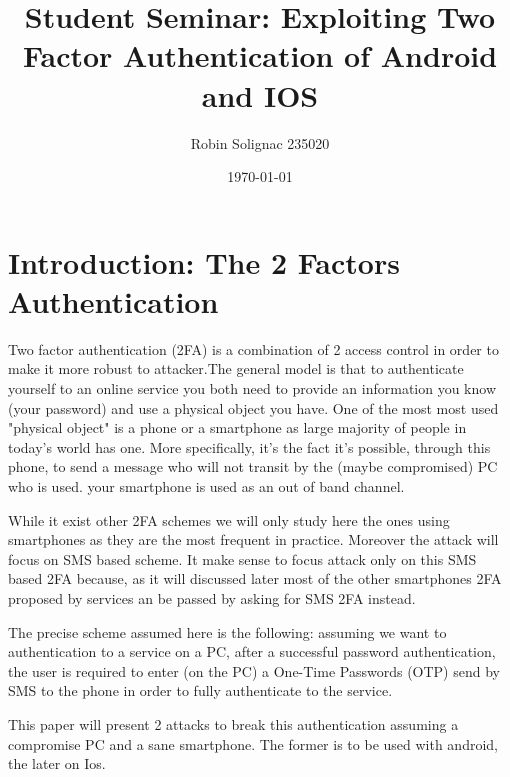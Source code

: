 \documentclass[11pt, a4paper,twocolumn]{article}
\title{Student Seminar: Exploiting Two Factor Authentication of Android and IOS}
\author{Robin Solignac 235020}
\date{\today}
\begin{document}
\maketitle
\begin{comment}
\begin{abstract}
Applications  which  can  be  used  in  different  platforms  now  use  two
factor authentication (2FA) to allow users to conveniently switch from one platform to another.
For example, when a user tries to login his gmail, it is not enough to enter correct password 
(first factor), it is also necessary to enter a PIN which is received by an SMS (second factor).
The aim of this project explaining the attacks against 2FA in IOS and Android devices and 
what can be the solutions. 
\end{abstract}
\end{comment}

\section{Introduction: The 2 Factors Authentication}

Two factor authentication (2FA) is a combination of 2 access control  in order to make it more robust to attacker.The general model is that to authenticate yourself to an online service you both need to provide an information you know (your password) and use a physical object you have. 
One of the most most used "physical object" is a phone or a smartphone
as large majority of people in today's world has one.
More specifically, it's the fact it's possible, through this phone, to send a message who will not transit by the (maybe compromised) PC 
who is used. your smartphone is used as an out of band channel.

While it exist other 2FA schemes we will only study here the ones using smartphones as they are the most frequent in practice. Moreover the attack will focus on SMS based scheme.
It make sense to focus attack only on this SMS based 2FA because, as it will discussed later most of the other smartphones 2FA proposed by services an be passed by asking for SMS 2FA instead.

The precise scheme assumed here is the following: assuming we want to authentication to a service on a PC, after a successful password authentication, the user is required to enter (on the PC) a One-Time Passwords (OTP) send by SMS to the phone in order to fully authenticate to the service. 

This paper will present 2 attacks to break this authentication assuming a compromise PC and a sane smartphone. The former is to be used with android, the later on Ios.
\end{document}
